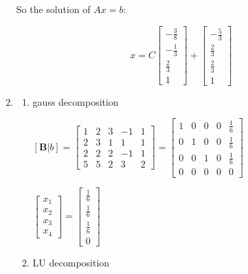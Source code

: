 \documentclass[english,onecolumn]{IEEEtran}
\begin{document}
\begin{enumerate}
So the solution of $Ax=b$:

$$
x = C \left[\begin{array}{c}
	-\frac{3}{8}\\
	-\frac{1}{3}\\
	\frac{2}{3}\\
	1 
\end{array}\right] + 
\left[\begin{array}{c}
	-\frac{5}{3}\\
	\frac{2}{3}\\
	\frac{2}{3}\\
	1 
\end{array}\right] 
$$

    \item 
    
    \begin{enumerate}
    	
		 	
		\item gauss decomposition
		
		$[\mathbf{B}|b] = \left[\begin{array}{cccc|c}
		1 & 2 & 3 & -1&1\\
		2 & 3 & 1 & 1&1\\
		2 & 2 & 2 & -1&1\\
		5 & 5 & 2 & 3&2
		\end{array}\right] = 
		\left[\begin{array}{cccc|c}
			1 & 0 & 0 & 0 & \frac{1}{6}\\
			0 & 1 & 0  &0 & \frac{1}{6}\\
			0 & 0 & 1 & 0 &\frac{1}{6}\\
			0 & 0 & 0 & 0&0
		\end{array}\right]
		$    	
		
		 $
		 \left[\begin{array}{c}
		 	x_1\\
		 	x_2\\
		 	x_3\\
		 	x_4 
		 \end{array}\right] = \left[\begin{array}{c}
		 	\frac{1}{6}\\
		 	\frac{1}{6}\\
		 	\frac{1}{6}\\
		 	0
		 \end{array}\right]
		 $   	
		 
		 
		  \item LU decomposition
		  

\end{enumerate}
\end{enumerate}
\end{document}
